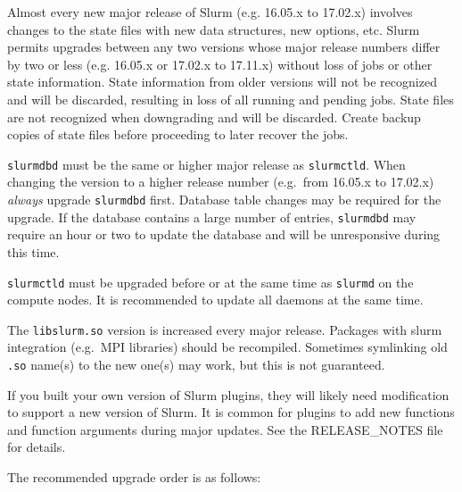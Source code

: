 Almost every new major release of Slurm (e.g. 16.05.x to 17.02.x) involves changes to the state files with new data structures, new options, etc. Slurm permits upgrades between any two versions whose major release numbers differ by two or less (e.g. 16.05.x or 17.02.x to 17.11.x) without loss of jobs or other state information. State information from older versions will not be recognized and will be discarded, resulting in loss of all running and pending jobs. State files are not recognized when downgrading and will be discarded. Create backup copies of state files before proceeding to later recover the jobs.

\texttt{slurmdbd} must be the same or higher major release as \texttt{slurmctld}. When changing the version to a higher release number (e.g.\ from 16.05.x to 17.02.x) \emph{always} upgrade \texttt{slurmdbd} first. Database table changes may be required for the upgrade. If the database contains a large number of entries, \texttt{slurmdbd} may require an hour or two to update the database and will be unresponsive during this time.

\texttt{slurmctld} must be upgraded before or at the same time as \texttt{slurmd} on the compute nodes. It is recommended to update all daemons at the same time.

The \texttt{libslurm.so} version is increased every major release. Packages with slurm integration (e.g.\ MPI libraries) should be recompiled. Sometimes symlinking old \texttt{.so} name(s) to the new one(s) may work, but this is not guaranteed.

If you built your own version of Slurm plugins, they will likely need modification to support a new version of Slurm. It is common for plugins to add new functions and function arguments during major updates. See the RELEASE\_NOTES file for details.

The recommended upgrade order is as follows:

